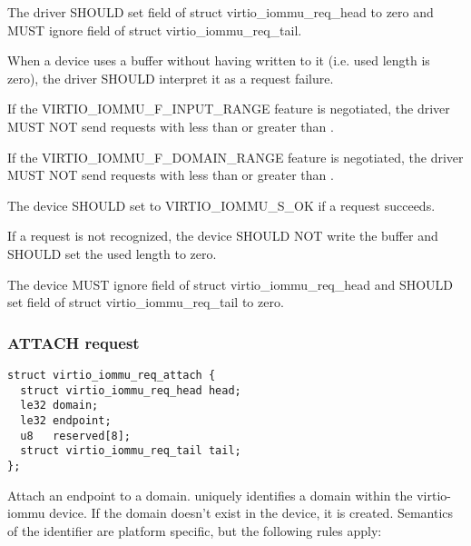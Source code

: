 
The driver SHOULD set field  of struct
virtio_iommu_req_head to zero and MUST ignore field  of
struct virtio_iommu_req_tail.

When a device uses a buffer without having written to it (i.e.
used length is zero), the driver SHOULD interpret it as a request failure.

If the VIRTIO_IOMMU_F_INPUT_RANGE feature is negotiated, the driver MUST
NOT send requests with  less than
 or  greater than
.

If the VIRTIO_IOMMU_F_DOMAIN_RANGE feature is negotiated, the driver MUST
NOT send requests with  less than 
or greater than .


The device SHOULD set  to VIRTIO_IOMMU_S_OK if a request
succeeds.

If a request  is not recognized, the device SHOULD NOT write
the buffer and SHOULD set the used length to zero.

The device MUST ignore field  of struct
virtio_iommu_req_head and SHOULD set field  of struct
virtio_iommu_req_tail to zero.

\subsubsection{ATTACH request}\label{sec:Device Types / IOMMU Device / Device operations / ATTACH request}

\begin{lstlisting}
struct virtio_iommu_req_attach {
  struct virtio_iommu_req_head head;
  le32 domain;
  le32 endpoint;
  u8   reserved[8];
  struct virtio_iommu_req_tail tail;
};
\end{lstlisting}

Attach an endpoint to a domain.  uniquely identifies a
domain within the virtio-iommu device. If the domain doesn't exist in the
device, it is created. Semantics of the  identifier are
platform specific, but the following rules apply:

